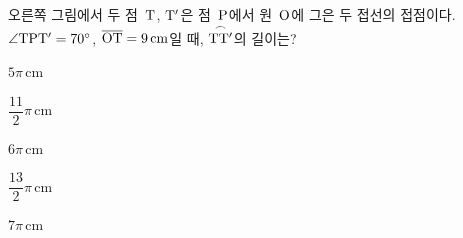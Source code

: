\noindent\begin{minipage}[t]{0.58\linewidth}\vspace{0pt}\raggedright 오른쪽 그림에서 두 점~$\mathrm{T}$, $\mathrm{T'}$은 점~$\mathrm{P}$에서 원~$\mathrm{O}$에 그은 두 접선의 접점이다. $\angle\mathrm{TPT'}=70^\circ$, $\overline{\mathrm{OT}}=9\,\mathrm{cm}$일 때, $\overset{\frown}{\mathrm{TT'}}$의 길이는?\end{minipage}\hfill\begin{minipage}[t]{0.4\linewidth}\vspace{0pt}\centering \resizebox{\ifdim\width>\linewidth\linewidth\else\width\fi}{!}{}\end{minipage}\par
\begin{choices32}{\rule[-3ex]{0pt}{8ex}$5\pi\,\mathrm{cm}$}{\rule[-3ex]{0pt}{8ex}$\dfrac{11}{2}\pi\,\mathrm{cm}$}{\rule[-3ex]{0pt}{8ex}$6\pi\,\mathrm{cm}$}{\rule[-3ex]{0pt}{8ex}$\dfrac{13}{2}\pi\,\mathrm{cm}$}{\rule[-3ex]{0pt}{8ex}$7\pi\,\mathrm{cm}$}\end{choices32}
